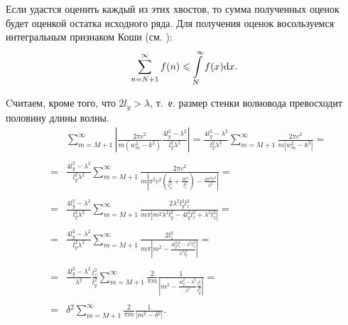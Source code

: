Если удастся оценить каждый из этих хвостов, то сумма полученных оценок будет оценкой остатка исходного ряда. Для получения оценок восользуемся интегральным признаком Коши (см. \cite{sendov}): \\
\[
\sum \limits_{n = N + 1}^{\infty} f(n) \leqslant \int \limits_N^{\infty} f(x) \mathrm{d} x.
\]

Cчитаем, кроме того, что $2 l_y > \lambda$, т.~е. размер стенки волновода превосходит половину длины волны.
\begin{eqnarray*}
  & &\sum \limits_{m=M+1}^{\infty} \left| \frac{2\pi c^2}{m(w_m^2 - k^2)} \frac{4l_y^2 - \lambda^2}{l_y^2\lambda^2} \right| =
  \frac{4l_y^2 - \lambda^2}{l_y^2\lambda^2} \sum \limits_{m=M+1}^{\infty} \frac{2\pi c^2}{m \left| w_m^2 - k^2 \right|} =\\
  \\
  &=&\frac{4l_y^2 - \lambda^2}{l_y^2\lambda^2} \sum \limits_{m=M+1}^{\infty} \frac{2\pi c^2}{m \left| \pi^2 c^2 \left( \frac{1}{l_y^2} + \frac{m^2}{l_z^2} \right) - \frac{4 \pi^2 c^2}{\lambda^2} \right|} = \\
  \\
  &=& \frac{4l_y^2 - \lambda^2}{l_y^2\lambda^2} \sum \limits_{m=M+1}^{\infty} \frac{2 \lambda^2 l_y^2 l_z^2}{m \pi \left| m^2 \lambda^2 l_y^2 - 4 l_y^2 l_z^2 + \lambda^2 l_z^2 \right|} =\\
  \\
  &=&\frac{4l_y^2 - \lambda^2}{l_y^2\lambda^2} \sum \limits_{m=M+1}^{\infty} \frac{2 l_z^2}{m \pi \left| m^2 - \frac{4 l_y^2 l_z^2 - \lambda^2 l_z^2}{\lambda^2 l_y^2} \right|} = \\
  \\
  &=& \frac{4l_y^2 - \lambda^2}{\lambda^2} \frac{l_z^2}{l_y^2} \sum \limits_{m=M+1}^{\infty} \frac{2}{\pi m} \frac{1}{\left| m^2 - \frac{4l_y^2 - \lambda^2}{\lambda^2} \frac{l_z^2}{l_y^2} \right|} =\\
  \\
  &=& \delta{}^2 \sum \limits_{m=M+1}^{\infty} \frac{2}{\pi m} \frac{1}{\left| m^2 - \delta{}^2 \right|}.
\end{eqnarray*}

